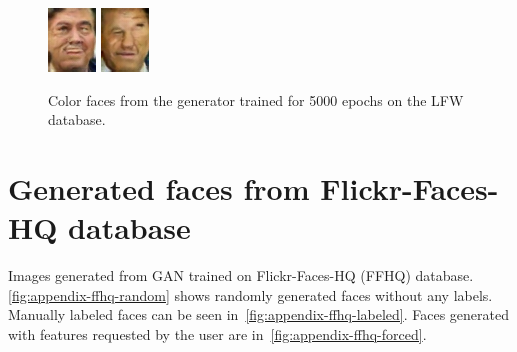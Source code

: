 \begin{figure}[!h]
{        \includegraphics[scale=1]{figures/lfw/appendix3/lfw64x48color_image0078.png}
        \includegraphics[scale=1]{figures/lfw/appendix3/lfw64x48color_image0079.png}
    }
    \caption{\label{fig:appendix-lfw3}Color faces from the generator trained for 5000 epochs on the LFW database.}
\end{figure}

\section*{Generated faces from Flickr-Faces-HQ database}
Images generated from GAN trained on Flickr-Faces-HQ (FFHQ) database. \autoref{fig:appendix-ffhq-random} shows randomly generated faces without any labels. Manually labeled faces can be seen in~\autoref{fig:appendix-ffhq-labeled}. Faces generated with features requested by the user are in~\autoref{fig:appendix-ffhq-forced}.

\clearpage

